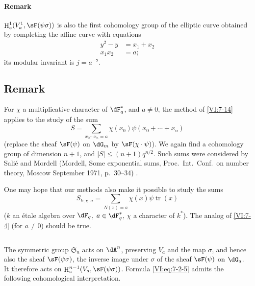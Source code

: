\documentclass[oneside]{book}
\DeclareMathOperator{\h}{H}
\DeclareMathOperator{\tr}{tr}
\newcounter{char}
\theoremstyle{sga-source}
\theoremstyle{sga-source-dash}
\theoremstyle{sga-source-dotdash}
\theoremstyle{sga-source-number-note-dash}
\theoremstyle{sga-source-note-number-dotdash}
\theoremstyle{sga-source-example-dotdash}
\theoremstyle{sga-source-inline-number}
\theoremstyle{sga-source-bare-number}
\theoremstyle{sga-source}
\newcommand{\PrintPage}[1]{}\newcommand{\MathPage}[1]{}\newcommand{\PrintCite}[2]{#1}\newcommand{\var}[3]{#2}
\begin{document}
\paragraph{Remark}

$\h_c^1(V_a^1,\sF(\psi\sigma))$ is also the first cohomology group of 
the elliptic curve obtained by completing the affine curve with equations 
\begin{align*}
  y^2-y &= x_1+x_2 \\
  x_1 x_2 &= a \text{;} 
\end{align*}
its modular invariant is $j=a^{-2}$. 





\PrintPage{228}
\subsection{Remark}\label{VI:7-18}

For $\chi$ a multiplicative character of $\dF_q^\ast$, and $a\ne 0$, the 
method of \ref{VI:7-14} applies to the study of the sum 
\[
  S = \sum_{x_0\dotsm x_n = a} \chi(x_0) \psi(x_0+\cdots + x_n) 
\]
(replace the sheaf $\sF(\psi)$ on $\dG_m$ by $\sF(\chi\cdot \psi)$). We 
again find a cohomology group of dimension $n+1$, and 
$|S|\leqslant (n+1)q^{n/2}$. Such sums were considered by 
Salié and Mordell (Mordell, Some exponential sums, Proc.~Int.~Conf.~on number theory, Moscow September 1971, p.~30--34) \cite{mo73}.

One may hope that our methods also make it possible to study the sums 
\[
  S_{k,\chi,a} = \sum_{N(x)=a} \chi(x) \psi \tr(x) 
\]
($k$ an étale algebra over $\dF_q$, $a\in \dF_q^\ast$, $\chi$ a character of 
$k^\ast$). The analog of \ref{VI:7-4} (for $a\ne 0$) should be true. 





\subsection{}\label{VI:7-19}

\var{The symmetric group $\mathfrak{S}_m$}{The symmetric group $\mathfrak{S}_n$}{S45-SOL-0966} acts on $\dA^n$, preserving $V_a$ and 
the map $\sigma$, and hence also the sheaf $\sF(\psi\sigma)$, the inverse 
image under $\sigma$ of the sheaf $\sF(\psi)$ on $\dG_a$. It therefore acts 
on $\h_c^{n-1}(V_a,\sF(\psi\sigma))$. Formula \eqref{VI:eq:7-2-5} admits 
the following cohomological interpretation.
\end{document}
